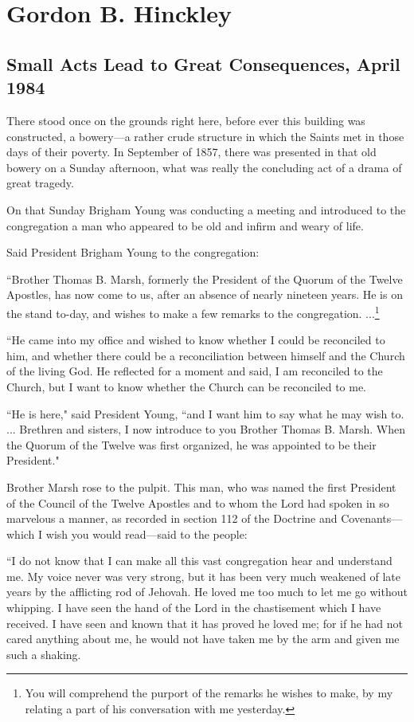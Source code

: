 \section{Gordon B. Hinckley}

\subsection{Small Acts Lead to Great Consequences, April 1984}

There stood once on the grounds right here, before ever this building was constructed, a bowery—a rather crude structure in which the Saints met in those days of their poverty. In September of 1857, there was presented in that old bowery on a Sunday afternoon, what was really the concluding act of a drama of great tragedy.

On that Sunday Brigham Young was conducting a meeting and introduced to the congregation a man who appeared to be old and infirm and weary of life.

Said President Brigham Young to the congregation:

``Brother Thomas B. Marsh, formerly the President of the Quorum of the Twelve Apostles, has now come to us, after an absence of nearly nineteen years. He is on the stand to-day, and wishes to make a few remarks to the congregation. ...\footnote{You will comprehend the purport of the remarks he wishes to make, by my relating a part of his conversation with me yesterday.}

``He came into my office and wished to know whether I could be reconciled to him, and whether there could be a reconciliation between himself and the Church of the living God. He reflected for a moment and said, I am reconciled to the Church, but I want to know whether the Church can be reconciled to me.

``He is here," said President Young, ``and I want him to say what he may wish to. ... Brethren and sisters, I now introduce to you Brother Thomas B. Marsh. When the Quorum of the Twelve was first organized, he was appointed to be their President."

Brother Marsh rose to the pulpit. This man, who was named the first President of the Council of the Twelve Apostles and to whom the Lord had spoken in so marvelous a manner, as recorded in section 112 of the Doctrine and Covenants—which I wish you would read—said to the people:

``I do not know that I can make all this vast congregation hear and understand me. My voice never was very strong, but it has been very much weakened of late years by the afflicting rod of Jehovah. He loved me too much to let me go without whipping. I have seen the hand of the Lord in the chastisement which I have received. I have seen and known that it has proved he loved me; for if he had not cared anything about me, he would not have taken me by the arm and given me such a shaking.

